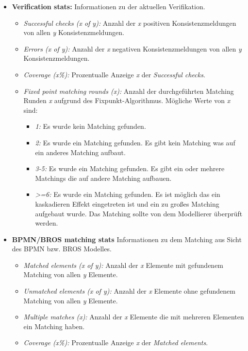 \begin{itemize}
    \item \textbf{Verification stats:} Informationen zu der aktuellen Verifikation.
    \begin{itemize}
        \item \emph{Successful checks (x of y):} Anzahl der \emph{x} positiven Konsistenzmeldungen von allen \emph{y} Konsistenzmeldungen. 
        \item \emph{Errors (x of y):} Anzahl der \emph{x} negativen Konsistenzmeldungen von allen \emph{y} Konsistenzmeldungen.
        \item \emph{Coverage (x\%):} Prozentualle Anzeige \emph{x} der \emph{Successful checks}.
        \clearpage
        \item \emph{Fixed point matching rounds (x):} Anzahl der durchgeführten Matching Runden \emph{x} aufgrund des Fixpunkt-Algorithmus. Mögliche Werte von \emph{x} sind:
        \begin{itemize}
            \item \emph{1:} Es wurde kein Matching gefunden.
            \item \emph{2:} Es wurde ein Matching gefunden. Es gibt kein Matching was auf ein anderes Matching aufbaut.
            \item \emph{3-5:} Es wurde ein Matching gefunden. Es gibt ein oder mehrere Matchings die auf andere Matching aufbauen.
            \item \emph{>=6:} Es wurde ein Matching gefunden. Es ist möglich das ein kaskadieren Effekt eingetreten ist und ein zu großes Matching aufgebaut wurde. Das Matching sollte von dem Modellierer überprüft werden.
        \end{itemize}
    \end{itemize}
    \item \textbf{BPMN/BROS matching stats} Informationen zu dem Matching aus Sicht des BPMN bzw. BROS Modelles.
    \begin{itemize}
        \item \emph{Matched elements (x of y):} Anzahl der \emph{x} Elemente mit gefundenem Matching von allen \emph{y} Elemente.
        \item \emph{Unmatched elements (x of y):} Anzahl der \emph{x} Elemente ohne gefundenem Matching von allen \emph{y} Elemente.
        \item \emph{Multiple matches (x):} Anzahl der \emph{x} Elemente die mit mehreren Elementen ein Matching haben. 
        \item \emph{Coverage (x\%):} Prozentualle Anzeige \emph{x} der \emph{Matched elements}.
    \end{itemize}
\end{itemize}

